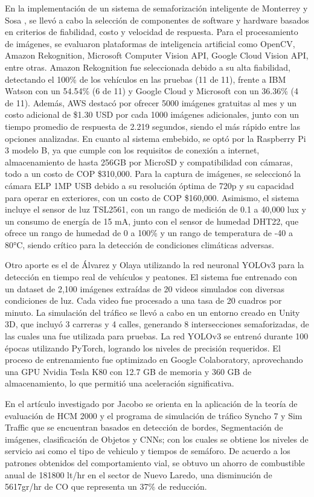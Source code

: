 \documentclass[conference]{IEEEtran}
\begin{document}
En la implementación de un sistema de semaforización inteligente de Monterrey y Sosa \cite{Monterrey2020}, se llevó a cabo la selección de componentes de software y hardware basados en criterios de fiabilidad, costo y velocidad de respuesta. Para el procesamiento de imágenes, se evaluaron plataformas de inteligencia artificial como OpenCV, Amazon Rekognition, Microsoft Computer Vision API, Google Cloud Vision API, entre otras. Amazon Rekognition fue seleccionada debido a su alta fiabilidad, detectando el 100\% de los vehículos en las pruebas (11 de 11), frente a IBM Watson con un 54.54\% (6 de 11) y Google Cloud y Microsoft con un 36.36\% (4 de 11). Además, AWS destacó por ofrecer 5000 imágenes gratuitas al mes y un costo adicional de \$1.30 USD por cada 1000 imágenes adicionales, junto con un tiempo promedio de respuesta de 2.219 segundos, siendo el más rápido entre las opciones analizadas. En cuanto al sistema embebido, se optó por la Raspberry Pi 3 modelo B, ya que cumple con los requisitos de conexión a internet, almacenamiento de hasta 256GB por MicroSD y compatibilidad con cámaras, todo a un costo de COP \$310,000. Para la captura de imágenes, se seleccionó la cámara ELP 1MP USB debido a su resolución óptima de 720p y su capacidad para operar en exteriores, con un costo de COP \$160,000. Asimismo, el sistema incluye el sensor de luz TSL2561, con un rango de medición de 0.1 a 40,000 lux y un consumo de energía de 15 mA, junto con el sensor de humedad DHT22, que ofrece un rango de humedad de 0 a 100\% y un rango de temperatura de -40 a 80°C, siendo crítico para la detección de condiciones climáticas adversas.

Otro aporte es el de Álvarez y Olaya \cite{Alvarez2021} utilizando la red neuronal YOLOv3 para la detección en tiempo real de vehículos y peatones. El sistema fue entrenado con un dataset de 2,100 imágenes extraídas de 20 videos simulados con diversas condiciones de luz. Cada video fue procesado a una tasa de 20 cuadros por minuto. La simulación del tráfico se llevó a cabo en un entorno creado en Unity 3D, que incluyó 3 carreras y 4 calles, generando 8 intersecciones semaforizadas, de las cuales una fue utilizada para pruebas. La red YOLOv3 se entrenó durante 100 épocas utilizando PyTorch, logrando los niveles de precisión requeridos. El proceso de entrenamiento fue optimizado en Google Colaboratory, aprovechando una GPU Nvidia Tesla K80 con 12.7 GB de memoria y 360 GB de almacenamiento, lo que permitió una aceleración significativa.

En el artículo investigado por Jacobo \cite{Jacobo2015} se orienta en la aplicación de la teoría de evaluación de HCM 2000 y el programa de simulación de tráfico Syncho 7 y Sim Traffic que se encuentran basados en detección de bordes, Segmentación de imágenes, clasificación de Objetos y CNNs; con los cuales se obtiene los niveles de servicio asi como el tipo de vehiculo y tiempos de semáforo. De acuerdo a los patrones obtenidos del comportamiento vial, se obtuvo un ahorro de combustible anual de 181800 lt/hr en el sector de Nuevo Laredo, una disminución de 5617gr/hr de CO que representa un 37\% de reducción.
\end{document}
